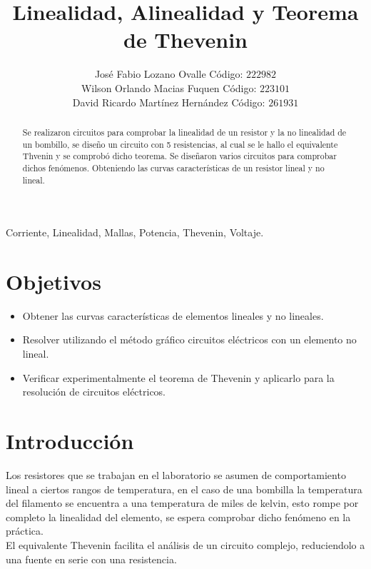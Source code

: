 \documentclass[twocolumn]{IEEEtran}
\begin{document}
\title{Linealidad, Alinealidad y Teorema de Thevenin}
\author{José Fabio Lozano Ovalle Código: $222982$\\
	Wilson Orlando Macias Fuquen Código: $223101$\\
	David Ricardo Martínez Hernández Código: $261931$}
\maketitle
{}

\begin{abstract}
 Se realizaron circuitos para comprobar la linealidad de un resistor y la no linealidad de un bombillo, se diseño un circuito con 5 resistencias, al cual se le hallo el equivalente Thvenin y se comprobó dicho teorema. Se diseñaron varios circuitos para comprobar dichos fenómenos. Obteniendo las curvas características de un resistor lineal y no lineal.
\end{abstract}

\begin{keywords}
 Corriente, Linealidad, Mallas, Potencia, Thevenin, Voltaje.
\end{keywords}

\section{Objetivos}
\noindent
\begin{itemize}
 \item Obtener las curvas características de elementos lineales y no lineales.
 \item Resolver utilizando el método gráfico circuitos eléctricos con un elemento no lineal.
 \item Verificar experimentalmente  el teorema de Thevenin y aplicarlo para la resolución de circuitos eléctricos.
\end{itemize}

\section{Introducción}
\noindent
Los resistores que se trabajan en el laboratorio se asumen de comportamiento lineal a ciertos rangos de temperatura, en el caso de una bombilla la temperatura del filamento se encuentra a una temperatura de miles de kelvin, esto rompe por completo la linealidad del elemento, se espera comprobar dicho fenómeno en la práctica.\\
El equivalente Thevenin facilita el análisis de un circuito complejo, reduciendolo a una fuente en serie con una resistencia.
\end{document}
